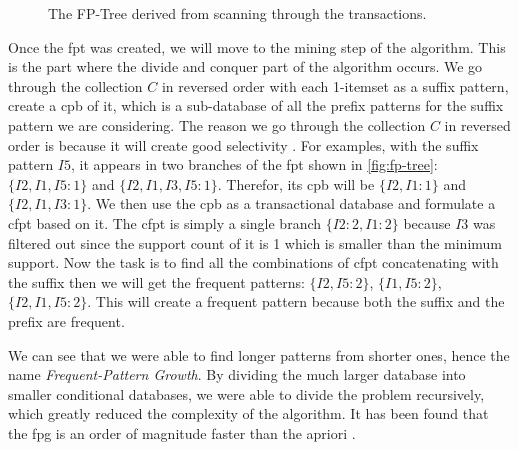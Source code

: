 \begin{figure}
    \centering
    \caption{The FP-Tree derived from scanning through the transactions.}
    \label{fig:fp-tree}
\end{figure}

Once the \acl{fpt} was created, we will move to the mining step of the algorithm.
This is the part where the divide and conquer part of the algorithm occurs.
We go through the collection $C$ in reversed order with each 1-itemset as a suffix pattern, create a \acl{cpb} of it, which is a sub-database of all the prefix patterns for the suffix pattern we are considering.
The reason we go through the collection $C$ in reversed order is because it will create good selectivity \citep{han2012mining}.
For examples, with the suffix pattern $I5$, it appears in two branches of the \acl{fpt} shown in \autoref{fig:fp-tree}: $\{I2, I1, I5: 1\}$ and $\{I2, I1, I3, I5: 1\}$.
Therefor, its \acl{cpb} will be $\{I2, I1: 1\}$ and $\{I2, I1, I3: 1\}$.
We then use the \acl{cpb} as a transactional database and formulate a \acl{cfpt} based on it.
The \acl{cfpt} is simply a single branch $\{I2:2, I1:2\}$ because $I3$ was filtered out since the support count of it is 1 which is smaller than the minimum support.
Now the task is to find all the combinations of \acl{cfpt} concatenating with the suffix then we will get the frequent patterns: $\{I2, I5: 2\}$, $\{I1, I5: 2\}$, $\{I2, I1, I5: 2\}$.
This will create a frequent pattern because both the suffix and the prefix are frequent.

We can see that we were able to find longer patterns from shorter ones, hence the name \textit{Frequent-Pattern Growth}.
By dividing the much larger database into smaller conditional databases, we were able to divide the problem recursively, which greatly reduced the complexity of the algorithm.
It has been found that the \acl{fpg} is an order of magnitude faster than the \acl{apriori} \citep{han2012mining}.